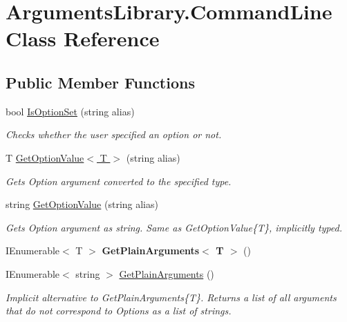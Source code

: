 \hypertarget{class_arguments_library_1_1_command_line}{\section{Arguments\+Library.\+Command\+Line Class Reference}
\label{class_arguments_library_1_1_command_line}
}
\subsection*{Public Member Functions}
\begin{DoxyCompactItemize}
\item 
bool \hyperlink{class_arguments_library_1_1_command_line_a62b6a2c027671fc637ed93347ed5ac98}{Is\+Option\+Set} (string alias)
\begin{DoxyCompactList}\small\item\em Checks whether the user specified an option or not. \end{DoxyCompactList}\item 
T \hyperlink{class_arguments_library_1_1_command_line_a23016d054a9fd5aa9de8358cba644206}{Get\+Option\+Value$<$ T $>$} (string alias)
\begin{DoxyCompactList}\small\item\em Gets Option argument converted to the specified type. \end{DoxyCompactList}\item 
string \hyperlink{class_arguments_library_1_1_command_line_ae57ef7960f96f48de5d58794bae5cdbf}{Get\+Option\+Value} (string alias)
\begin{DoxyCompactList}\small\item\em Gets Option argument as string. Same as Get\+Option\+Value\{\+T\}, implicitly typed. \end{DoxyCompactList}\item 
\hypertarget{class_arguments_library_1_1_command_line_ac554dc3a56ba1a7565a2f4b44a1cb659}{I\+Enumerable$<$ T $>$ {\bfseries Get\+Plain\+Arguments$<$ T $>$} ()}\label{class_arguments_library_1_1_command_line_ac554dc3a56ba1a7565a2f4b44a1cb659}

\item 
I\+Enumerable$<$ string $>$ \hyperlink{class_arguments_library_1_1_command_line_ac4f5141de6dbbddef9e44bbf6b725bfc}{Get\+Plain\+Arguments} ()
\begin{DoxyCompactList}\small\item\em Implicit alternative to Get\+Plain\+Arguments\{\+T\}. Returns a list of all arguments that do not correspond to Options as a list of strings. \end{DoxyCompactList}\end{DoxyCompactItemize}


